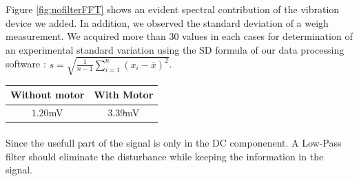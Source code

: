 \documentclass{article}[12pt]
\begin{document}
Figure \ref{fig:nofilterFFT} shows an evident spectral contribution of the vibration device we added. In addition, we observed the standard deviation of a weigh measurement. We acquired more than 30 values in each cases for determination of an experimental standard variation using the SD formula of our data processing software : $s = \sqrt{\frac{1}{n-1} \sum_{i=1}^n (x_i - \overline{x})^2}$. \\
\begin{center}
\begin{tabular}{|c|c|}
    \hline
    Without motor & With Motor \\
    \hline
     $1.20$mV & $3.39$mV \\
    \hline
\end{tabular}
\end{center}
\paragraph{}
Since the usefull part of the signal is only in the DC componenent. A Low-Pass filter should eliminate the disturbance while keeping the information in the signal.
\end{document}
